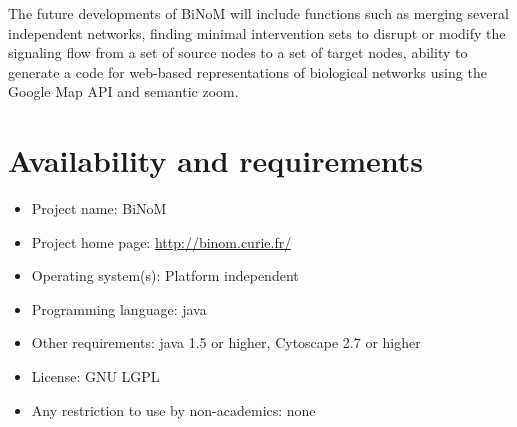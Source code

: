 \documentclass[10pt]{bmc_article}
\newenvironment{bmcformat}{\baselineskip20pt\sloppy\setboolean{publ}{false}}{\baselineskip20pt\sloppy}
\begin{document}
\begin{bmcformat}
The future developments of BiNoM will include functions such as merging several
independent networks, finding minimal intervention sets to disrupt or modify the
signaling flow from a set of source nodes to a set of target nodes, ability to
generate a code for web-based representations of biological networks using the
Google Map API and semantic zoom.


\section*{Availability and requirements}

\begin{itemize}
\item Project name: BiNoM
\item Project home page: \url{http://binom.curie.fr/}
\item Operating system(s): Platform independent
\item Programming language: java
\item Other requirements: java 1.5 or higher, Cytoscape 2.7 or higher
\item License: GNU LGPL
\item Any restriction to use by non-academics: none
\end{itemize}





\bigskip



\end{bmcformat}
\end{document}
